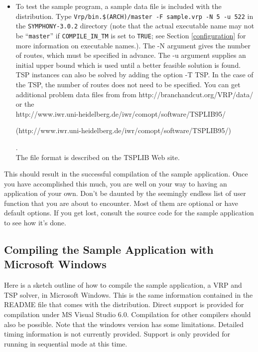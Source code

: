 \begin{itemize}
        \item To test the sample program, a sample data file is included with
the distribution. Type {\tt Vrp/bin.\$(ARCH)/master -F sample.vrp -N 5 -u
522} in the {\tt SYMPHONY-3.0.2} directory (note that the actual executable name may
not be ``{\tt master}'' if {\tt COMPILE\_IN\_TM} is set to {\tt TRUE}; see
Section \ref{configuration} for more information on executable names.). The -N
argument gives the number of routes, which must be specified in advance. The
-u argument supplies an initial upper bound which is used until a better
feasible solution is found. TSP instances can also be solved by adding the
option -T TSP. In the case of the TSP, the number of routes does not need to
be specified. You can get additional problem data files from from
{http://branchandcut.org/VRP/data/} or the \\
{http://www.iwr.uni-heidelberg.de/iwr/comopt/software/TSPLIB95/}
\begin{latexonly}
        (http://www.iwr.uni-heidelberg.de/iwr/comopt/software/TSPLIB95/)
\end{latexonly}. \\
The file
format is described on the TSPLIB Web site.

\end{itemize}

\noindent This should result in the successful compilation of the sample
application. Once you have accomplished this much, you are well on
your way to having an application of your own. Don't be daunted by the
seemingly endless list of user function that you are about to
encounter. Most of them are optional or have default options. If you
get lost, consult the source code for the sample application to see
how it's done.

\subsection{Compiling the Sample Application with Microsoft Windows}
\label{getting_strated_windows}

Here is a sketch outline of how to compile the sample application, a VRP and
TSP solver, in Microsoft Windows. This is the same information contained in
the README file that comes with the distribution. Direct support is provided
for compilation under MS Visual Studio 6.0. Compilation for other compilers
should also be possible. Note that the windows version has some
limitations. Detailed timing information is not currently provided.  Support
is only provided for running in sequential mode at this time.

